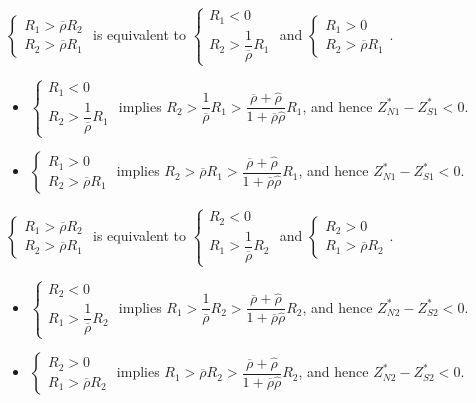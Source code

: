 \documentclass[10pt]{article}
\begin{document}
$ \left\{ \begin{matrix} R_1 > \overline{\rho} R_2 \\ R_2 > \overline{\rho} R_1 \end{matrix} \right. $ is equivalent to $ \left\{ \begin{matrix} R_1 < 0 \\ R_2 > \dfrac{1}{\overline{\rho}} R_1 \end{matrix} \right. $ and $ \left\{ \begin{matrix} R_1 > 0 \\ R_2 > \overline{\rho} R_1 \end{matrix} \right. $. 
\begin{itemize}
\item $ \left\{ \begin{matrix} R_1 < 0 \\ R_2 > \dfrac{1}{\overline{\rho}} R_1 \end{matrix} \right. $ implies $ R_2 > \dfrac{1}{\overline{\rho}} R_1 > \dfrac{\overline{\rho} + {\hat \rho}}{1 + \overline{\rho} {\hat \rho}} R_1 $, and hence $ Z_{N 1}^* - Z_{S 1}^* < 0 $.
\item $ \left\{ \begin{matrix} R_1 > 0 \\ R_2 > \overline{\rho} R_1 \end{matrix} \right. $ implies $ R_2 > \overline{\rho} R_1 > \dfrac{\overline{\rho} + {\hat \rho}}{1 + \overline{\rho} {\hat \rho}} R_1 $, and hence $ Z_{N 1}^* - Z_{S 1}^* < 0 $.
\end{itemize}

$ \left\{ \begin{matrix} R_1 > \overline{\rho} R_2 \\ R_2 > \overline{\rho} R_1 \end{matrix} \right. $ is equivalent to $ \left\{ \begin{matrix} R_2 < 0 \\ R_1 > \dfrac{1}{\overline{\rho}} R_2 \end{matrix} \right. $ and $ \left\{ \begin{matrix} R_2 > 0 \\ R_1 > \overline{\rho} R_2 \end{matrix} \right. $. 
\begin{itemize}
\item $ \left\{ \begin{matrix} R_2 < 0 \\ R_1 > \dfrac{1}{\overline{\rho}} R_2 \end{matrix} \right. $ implies $ R_1 > \dfrac{1}{\overline{\rho}} R_2 > \dfrac{\overline{\rho} + {\hat \rho}}{1 + \overline{\rho} {\hat \rho}} R_2 $, and hence $ Z_{N 2}^* - Z_{S 2}^* < 0 $.
\item $ \left\{ \begin{matrix} R_2 > 0 \\ R_1 > \overline{\rho} R_2 \end{matrix} \right. $ implies $ R_1 > \overline{\rho} R_2 > \dfrac{\overline{\rho} + {\hat \rho}}{1 + \overline{\rho} {\hat \rho}} R_2 $, and hence $ Z_{N 2}^* - Z_{S 2}^* < 0 $.
\end{itemize}
\end{document}
